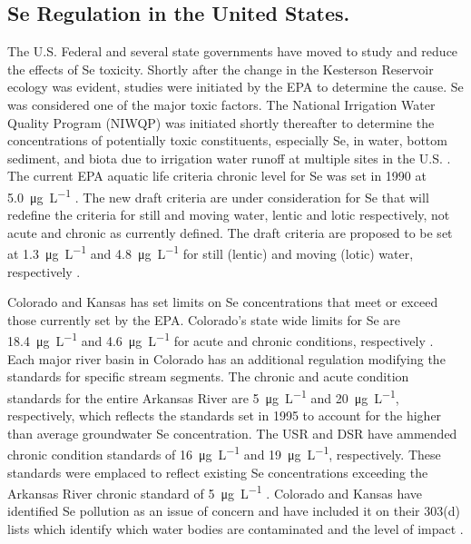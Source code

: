 \begin{linenumbers}[1]
\subsection*{Se Regulation in the United States.}
The U.S. Federal and several state governments have moved to study and reduce the effects of Se toxicity.  Shortly after the change in the Kesterson Reservoir ecology was evident, studies were initiated by the EPA to determine the cause.  Se was considered one of the major toxic factors.  The National Irrigation Water Quality Program (NIWQP) was initiated shortly thereafter to determine the concentrations of potentially toxic constituents, especially Se, in water, bottom sediment, and biota due to irrigation water runoff at multiple sites in the U.S. \parencite{Hamilton1999}.  The current EPA aquatic life criteria chronic level for Se was set in 1990 at \SI{5.0}{\micro\gram\per\liter} \parencite{EPA-Se}.  The new draft criteria are under consideration for Se that will redefine the criteria for still and moving water, lentic and lotic respectively, not acute and chronic as currently defined.  The draft criteria are proposed to be set at \SI{1.3}{\micro\gram\per\liter} and \SI{4.8}{\micro\gram\per\liter} for still (lentic) and moving (lotic) water, respectively \parencite{2014USEPA,Hamilton1999,EPA-Se}.

Colorado and Kansas has set limits on Se concentrations that meet or exceed those currently set by the EPA.  Colorado's state wide limits for Se are \SI{18.4}{\micro\gram\per\liter} and \SI{4.6}{\micro\gram\per\liter} for acute and chronic conditions, respectively \parencite{5CCR1002-31}.  Each major river basin in Colorado has an additional regulation modifying the standards for specific stream segments.  The chronic and acute condition standards for the entire Arkansas River are \SI{5}{\micro\gram\per\liter} and \SI{20}{\micro\gram\per\liter}, respectively, which reflects the standards set in 1995 to account for the higher than average groundwater Se concentration.  The USR and DSR have ammended chronic condition standards of \SI{16}{\micro\gram\per\liter} and \SI{19}{\micro\gram\per\liter}, respectively.  These standards were emplaced to reflect existing Se concentrations exceeding the Arkansas River chronic standard of \SI{5}{\micro\gram\per\liter} \parencite{5CCR1002-32}.  Colorado and Kansas have identified Se pollution as an issue of concern and have included it on their 303(d) lists which identify which water bodies are contaminated and the level of impact \parencite{5CCR1002-93,2014Kansas303d}.


\end{linenumbers}
